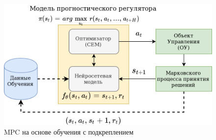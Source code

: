 \documentclass[a4paper,12pt]{article}
\begin{document}
\begin{figure}[H]
    \centering
    \includegraphics[width=\textwidth]{img/mpc_ru.png}
    \caption{MPC на основе обучения с подкреплением}
    \label{fig:my_label}
\end{figure}
\end{document}
